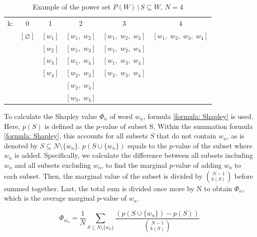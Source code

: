 \begin{table}[h]
\caption{Example of the power set $P(W) \,|\, S \subseteq W,\, N=4$}
\centering
\begin{tabular}{c c c c c c}
\cmidrule(lr){2-6}
k: & 0 & 1 & 2 & 3 & 4\\ 
\cmidrule(lr){2-2} \cmidrule(lr){3-3} \cmidrule(lr){4-4} \cmidrule(lr){5-5} \cmidrule(lr){6-6}
&$[\varnothing]$ &   $[w_1]$ &   $[w_1,\; w_2]$ &    $[w_1,\; w_2,\; w_3]$   &   $[w_1,\; w_2,\; w_3,\; w_4]$    \\
&                &   $[w_2]$ &   $[w_1,\; w_3]$ &    $[w_1,\; w_2,\; w_4]$   &                                   \\
&                &   $[w_3]$ &   $[w_1,\; w_4]$ &    $[w_1,\; w_3,\; w_4]$   &                                   \\
&                &   $[w_4]$ &   $[w_2,\; w_3]$ &    $[w_2,\; w_3,\; w_4]$   &                                   \\
&                &           &   $[w_2,\; w_4]$ &                            &                                   \\
&                &           &   $[w_3,\; w_4]$ &                            &                                   \\ 
\bottomrule
\end{tabular}
\label{tab:shapley_subsets}
\end{table}

To calculate the Shapley value $\Phi_n$ of word $w_n$, formula \ref{formula: Shapley} is used. Here, $p(S)$ is defined as the $p$-value of subset S. Within the summation formula \ref{formula: Shapley}, this accounts for all subsets $S$ that do not contain $w_n$, as is denoted by $S \subseteq N \setminus \{w_n\}$. $p(S \cup \{w_n\})$ equals to the $p$-value of the subset where $w_n$ is added. Specifically, we calculate the difference between all subsets including $w_n$ and all subsets excluding $w_n$, to find the marginal $p$-value of adding $w_n$ to each subset. Then, the marginal value of the subset is divided by $\binom{N-1}{k(S)}$ before summed together. Last, the total sum is divided once more by N to obtain $\Phi_n$, which is the average marginal $p$-value of $w_n$.

\begin{equation}
\label{formula: Shapley}
\Phi_{w_n} = \frac{1}{N} \sum_{S \subseteq N \setminus \{w_n\}} \frac{(p(S \cup \{w_n\}) - p(S))}{\binom{N-1}{k(S)}}
\end{equation} 

